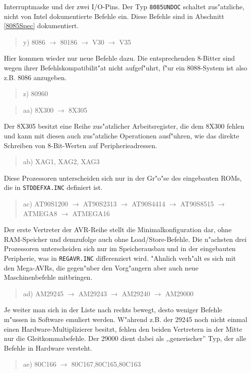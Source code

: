 \documentclass[12pt,a4paper,twoside]{report}
\newcommand{\tty}[1]{{\tt #1}}
\begin{document}
{Interruptmaske und der zwei I/O-Pins.  Der Typ {\tt 8085UNDOC} schaltet
zus"atzliche, nicht von Intel dokumentierte Befehle ein.  Diese Befehle
sind in Abschnitt \ref{8085Spec} dokumentiert.
\begin{quote}
y) 8086 $\rightarrow$ 80186 $\rightarrow$ V30 $\rightarrow$ V35
\end{quote}
Hier kommen wieder nur neue Befehle dazu.  Die entsprechenden 8-Bitter sind
wegen ihrer Befehlskompatibilit"at nicht aufgef"uhrt, f"ur ein 8088-System
ist also z.B. 8086 anzugeben.
\begin{quote}
z) 80960
\end{quote}
\begin{quote}
aa) 8X300 $\rightarrow$ 8X305
\end{quote}
Der 8X305 besitzt eine Reihe zus"atzlicher Arbeitsregister, die dem
8X300 fehlen und kann mit diesen auch zus"atzliche Operationen ausf"uhren,
wie das direkte Schreiben von 8-Bit-Werten auf Peripherieadressen.
\begin{quote}
ab) XAG1, XAG2, XAG3
\end{quote}
Diese Prozessoren unterscheiden sich nur in der Gr"o"se des eingebauten
ROMs, die in \tty{STDDEFXA.INC} definiert ist.
\begin{quote}
ac) AT90S1200 $\rightarrow$ AT90S2313 $\rightarrow$ AT90S4414 $\rightarrow$
    AT90S8515 $\rightarrow$ ATMEGA8 $\rightarrow$ ATMEGA16
\end{quote}
Der erste Vertreter der AVR-Reihe stellt die Minimalkonfiguration dar,
ohne RAM-Speicher und demzufolge auch ohne Load/Store-Befehle.  Die
n"achsten drei Prozessoren unterscheiden sich nur im Speicherausbau
und in der eingebauten Peripherie, was in \tty{REGAVR.INC} differenziert
wird.  "Ahnlich verh"alt es sich mit den Mega-AVRs, die gegen"uber den
Vorg"angern aber auch neue Maschinenbefehle mitbringen.
\begin{quote}
ad) AM29245 $\rightarrow$ AM29243 $\rightarrow$ AM29240 $\rightarrow$ AM29000
\end{quote}
Je weiter man sich in der Liste nach rechts bewegt, desto weniger
Befehle m"ussen in Software emuliert werden.  W"ahrend z.B. der 29245
noch nicht einmal einen Hardware-Multiplizierer besitzt, fehlen den
beiden Vertretern in der Mitte nur die Gleitkommabefehle.  Der 29000
dient dabei als ,,generischer'' Typ, der alle Befehle in Hardware versteht.
\begin{quote}
ae) 80C166 $\longrightarrow$ 80C167,80C165,80C163

\end{quote}}
\end{document}
